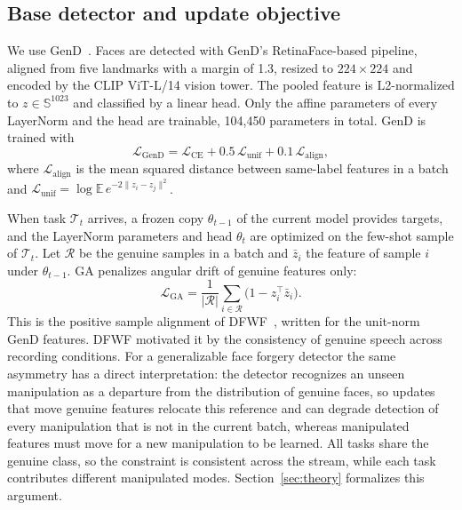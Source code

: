 \documentclass{ieeeaccess}
\begin{document}
\subsection{Base detector and update objective}
We use GenD~\cite{yermakov2026gend}. Faces are detected with GenD's RetinaFace-based pipeline, aligned from five landmarks with a margin of 1.3, resized to $224\times224$ and encoded by the CLIP ViT-L/14 vision tower. The pooled feature is L2-normalized to $z\in\mathbb{S}^{1023}$ and classified by a linear head. Only the affine parameters of every LayerNorm and the head are trainable, 104{,}450 parameters in total. GenD is trained with
\begin{equation}
\mathcal{L}_{\mathrm{GenD}}=\mathcal{L}_{\mathrm{CE}}+0.5\,\mathcal{L}_{\mathrm{unif}}+0.1\,\mathcal{L}_{\mathrm{align}},
\end{equation}
where $\mathcal{L}_{\mathrm{align}}$ is the mean squared distance between same-label features in a batch and $\mathcal{L}_{\mathrm{unif}}=\log\mathbb{E}\,e^{-2\|z_i-z_j\|^2}$.

When task $\mathcal{T}_t$ arrives, a frozen copy $\theta_{t-1}$ of the current model provides targets, and the LayerNorm parameters and head $\theta_t$ are optimized on the few-shot sample of $\mathcal{T}_t$. Let $\mathcal{R}$ be the genuine samples in a batch and $\bar z_i$ the feature of sample $i$ under $\theta_{t-1}$. GA penalizes angular drift of genuine features only:
\begin{equation}
\mathcal{L}_{\mathrm{GA}}=\frac{1}{|\mathcal{R}|}\sum_{i\in\mathcal{R}}\big(1-z_i^{\top}\bar z_i\big).
\end{equation}
This is the positive sample alignment of DFWF~\cite{ma2021dfwf}, written for the unit-norm GenD features. DFWF motivated it by the consistency of genuine speech across recording conditions. For a generalizable face forgery detector the same asymmetry has a direct interpretation: the detector recognizes an unseen manipulation as a departure from the distribution of genuine faces, so updates that move genuine features relocate this reference and can degrade detection of every manipulation that is not in the current batch, whereas manipulated features must move for a new manipulation to be learned. All tasks share the genuine class, so the constraint is consistent across the stream, while each task contributes different manipulated modes. Section~\ref{sec:theory} formalizes this argument.
\end{document}
